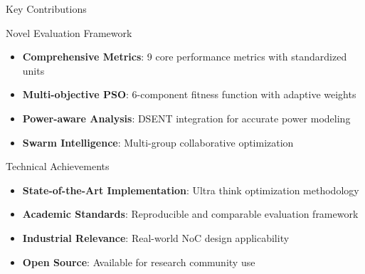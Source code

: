 \documentclass[10pt,aspectratio=169]{beamer}
\begin{document}
\begin{frame}{Key Contributions}
    \begin{block}{Novel Evaluation Framework}
        \begin{itemize}
            \item \textbf{Comprehensive Metrics}: 9 core performance metrics with standardized units
            \item \textbf{Multi-objective PSO}: 6-component fitness function with adaptive weights
            \item \textbf{Power-aware Analysis}: DSENT integration for accurate power modeling
            \item \textbf{Swarm Intelligence}: Multi-group collaborative optimization
        \end{itemize}
    \end{block}
    
    \begin{block}{Technical Achievements}
        \begin{itemize}
            \item \textbf{State-of-the-Art Implementation}: Ultra think optimization methodology
            \item \textbf{Academic Standards}: Reproducible and comparable evaluation framework
            \item \textbf{Industrial Relevance}: Real-world NoC design applicability
            \item \textbf{Open Source}: Available for research community use
        \end{itemize}
    \end{block}
\end{frame}
\end{document}
